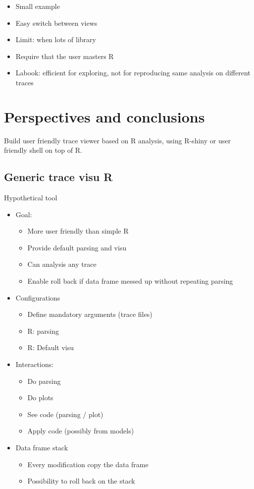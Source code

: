 \begin{itemize}
    \item Small example
    \item Easy switch between views
    \item Limit: when lots of library
    \item Require that the user masters R
    \item Labook: efficient for exploring, not for reproducing same analysis on different traces
\end{itemize}

\section{Perspectives and conclusions}
\label{sec:visu-cncl}

Build user friendly trace viewer based on R analysis, using R-shiny or user friendly shell on top of R.

\subsection{Generic trace visu R}

Hypothetical tool
\begin{itemize}
    \item Goal:
        \begin{itemize}
            \item More user friendly than simple R
            \item Provide default parsing and visu
            \item Can analysis any trace
            \item Enable roll back if data frame messed up without repeating parsing
        \end{itemize}
    \item Configurations
        \begin{itemize}
            \item Define mandatory arguments (trace files)
            \item R: parsing
            \item R: Default visu
        \end{itemize}
    \item Interactions:
        \begin{itemize}
            \item Do parsing
            \item Do plots
            \item See code (parsing / plot)
            \item Apply code (possibly from models)
        \end{itemize}
    \item Data frame stack
        \begin{itemize}
            \item Every modification copy the data frame
            \item Possibility to roll back on the stack
        \end{itemize}
\end{itemize}

